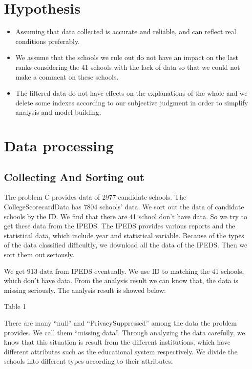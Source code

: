 \section{Hypothesis}
\begin{itemize}
    \item  Assuming that data collected is accurate and reliable, and can reflect real conditions preferably.
    \item We assume that the schools we rule out do not have an impact on the last ranks considering the 41 schools with the lack of data so that we could not make a comment on these schools. 
    \item The filtered data do not have effects on the explanations of the whole and we delete some indexes according to our subjective judgment in order to simplify analysis and model building. 
\end{itemize}\par
\section{Data processing}
\subsection{Collecting And Sorting out}
The problem C provides data of 2977 candidate schools. The CollegeScorecardData  has 7804 schools’ data. We sort out the data of candidate schools by the ID. We find that there are 41 school don’t have data. So we try to get these data from the IPEDS. The IPEDS provides various reports and the statistical data, which include year and statistical variable. Because of the types of the data classified difficultly, we download all the data of the IPEDS. Then we sort them out seriously.\par
We get 913 data from IPEDS eventually. We use ID to matching the 41 schools, which don’t have data. From the analysis result we can know that, the data is missing seriously. The analysis result is showed below:

Table 1

There are many “null” and “PrivacySuppressed” among the data the problem provides. We call them “missing data”. Through analyzing the data carefully, we know that this situation is result from the different institutions, which have different attributes such as the educational system respectively. We divide the schools into different types according to their attributes. 

